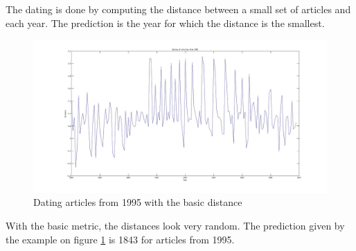 The dating is done by computing the distance between a small set of articles and each year. The prediction is the year for which the distance is the smallest.
\begin{figure}[H]
	\centering
        \includegraphics[scale=0.15]{Pictures/date_articles/distance1/dating1995_corrected.jpg}
        \caption{Dating articles from 1995 with the basic distance}
        \label{date_d1}
\end{figure}
With the basic metric, the distances look very random. The prediction given by the example on figure \ref{date_d1} is 1843 for articles from 1995.